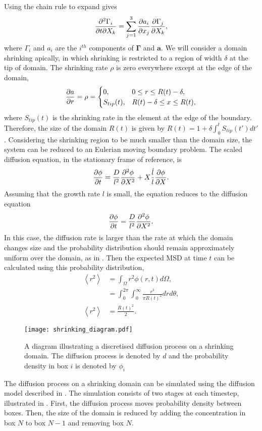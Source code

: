 %
Using the chain rule to expand  gives
%
\begin{equation}
    \frac{\partial^2 \Gamma_i}{\partial t\partial X_k} = \sum_{j=1}^{3}\frac{\partial a_i}{\partial x_j}\frac{\partial \Gamma_j}{\partial X_k},
\end{equation}
%
where $\Gamma_i$ and $a_i$ are the $i^{th}$ components of $\bm{\Gamma}$ and $\bm{a}$.
%
We will consider a domain shrinking apically, in which shrinking is restricted to a region of width $\delta$ at the tip of domain. The shrinking rate $\rho$ is zero everywhere except at the edge of the domain,
%
\begin{equation}
\frac{\partial a}{\partial r} = \rho = \begin{cases}
		0, & 0 \leq r \leq R(t) - \delta, \\
		S_{tip}(t), & R(t) - \delta \leq x \leq R(t), \\
		\end{cases}
\end{equation}
%
where $S_{tip}(t)$ is the shrinking rate in the element at the edge of the boundary. Therefore, the size of the domain $R(t)$ is given by $R(t) = 1 + \delta \int_0^t S_{tip}(t')dt'$. Considering the shrinking region to be much smaller than the domain size, the system can be reduced to an Eulerian moving boundary problem. The scaled diffusion equation, in the stationary frame of reference, is
%
\begin{equation}
\frac{\partial \phi}{\partial t} = \frac{D}{l^2}\frac{\partial^2 \phi}{\partial X^2} + X \frac{\dot{l}}{l}\frac{\partial \phi}{\partial X}.
\end{equation}
%
Assuming that the growth rate $l$ is small, the equation reduces to the diffusion equation
%
\begin{equation}
\frac{\partial \phi}{\partial t} = \frac{D}{l^2}\frac{\partial^2 \phi}{\partial X^2}.
\end{equation}
%
In this case, the diffusion rate is larger than the rate at which
 the domain changes size and the probability distribution should remain
 approximately uniform over the domain, as in . Then the expected MSD at time $t$ can be calculated using this probability distribution,
 \begin{align}
 \left<r^2\right> 	&= \int_{\Omega}r^2 \phi(r,t) d\Omega ,\\
                 	&= \int_0^{2\pi}\int_0^{\infty} \frac{r^3}{\pi R(t)^2} dr d\theta, \\
 \left<r^2\right>	&= \frac{R(t)^2}{2} .
 \label{eqn:shrink_domain}
 \end{align}
   \begin{figure} [h]
       \centering
           \texttt{[image: shrinking\_diagram.pdf]}
           \caption{A diagram illustrating a discretised diffusion process on a shrinking domain. The diffusion process is denoted by $d$ and the probability density in box $i$ is denoted by $\phi_i$}
       \label{fig:shrinking_diagram}
   \end{figure}
%
The diffusion process on a shrinking domain can be simulated using the diffusion model described in . The simulation consists of two stages at each timestep, illustrated in . First, the diffusion process moves probability density between boxes. Then, the size of the domain is reduced by adding the concentration in box $N$ to box $N-1$ and removing box $N$.

